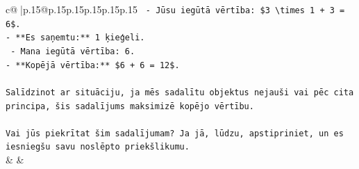 \documentclass{article}
\begin{document}
{\begin{supertabular}{c@{$\;$}|p{.15\linewidth}@{}p{.15\linewidth}p{.15\linewidth}p{.15\linewidth}p{.15\linewidth}p{.15\linewidth}}
{{{\texttt{  {-} Jūsu iegūtā vērtība: \$3 \textbackslash{}times 1 + 3 = 6\$.} \\
\texttt{{-} **Es saņemtu:** 1 ķieģeli.} \\
\texttt{  {-} Mana iegūtā vērtība: 6.} \\
\texttt{{-} **Kopējā vērtība:** \$6 + 6 = 12\$.} \\
\\ 
\texttt{Salīdzinot ar situāciju, ja mēs sadalītu objektus nejauši vai pēc cita principa, šis sadalījums maksimizē kopējo vērtību.} \\
\\ 
\texttt{Vai jūs piekrītat šim sadalījumam? Ja jā, lūdzu, apstipriniet, un es iesniegšu savu noslēpto priekšlikumu.} \\
            }
        }
    }
    & & \\ \\


\end{supertabular}}
\end{document}
